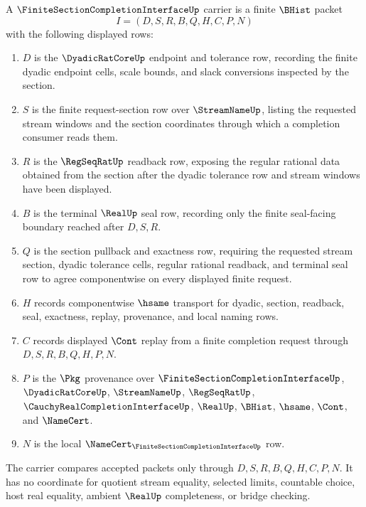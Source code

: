 \begin{definition}
\label{def:finite-section-completion-interface-carrier}
A $\FiniteSectionCompletionInterfaceUp$ carrier is a finite $\BHist$ packet
$$
I=(D,S,R,B,Q,H,C,P,N)
$$
with the following displayed rows:
\begin{enumerate}
\item $D$ is the $\DyadicRatCoreUp$ endpoint and tolerance row, recording the finite dyadic endpoint cells, scale bounds, and slack conversions inspected by the section.
\item $S$ is the finite request-section row over $\StreamNameUp$, listing the requested stream windows and the section coordinates through which a completion consumer reads them.
\item $R$ is the $\RegSeqRatUp$ readback row, exposing the regular rational data obtained from the section after the dyadic tolerance row and stream windows have been displayed.
\item $B$ is the terminal $\RealUp$ seal row, recording only the finite seal-facing boundary reached after $D,S,R$.
\item $Q$ is the section pullback and exactness row, requiring the requested stream section, dyadic tolerance cells, regular rational readback, and terminal seal row to agree componentwise on every displayed finite request.
\item $H$ records componentwise $\hsame$ transport for dyadic, section, readback, seal, exactness, replay, provenance, and local naming rows.
\item $C$ records displayed $\Cont$ replay from a finite completion request through $D,S,R,B,Q,H,P,N$.
\item $P$ is the $\Pkg$ provenance over $\FiniteSectionCompletionInterfaceUp$, $\DyadicRatCoreUp$, $\StreamNameUp$, $\RegSeqRatUp$, $\CauchyRealCompletionInterfaceUp$, $\RealUp$, $\BHist$, $\hsame$, $\Cont$, and $\NameCert$.
\item $N$ is the local $\NameCert_{\FiniteSectionCompletionInterfaceUp}$ row.
\end{enumerate}
The carrier compares accepted packets only through $D,S,R,B,Q,H,C,P,N$. It has no coordinate for quotient stream equality, selected limits, countable choice, host real equality, ambient $\RealUp$ completeness, or bridge checking.
\end{definition}

